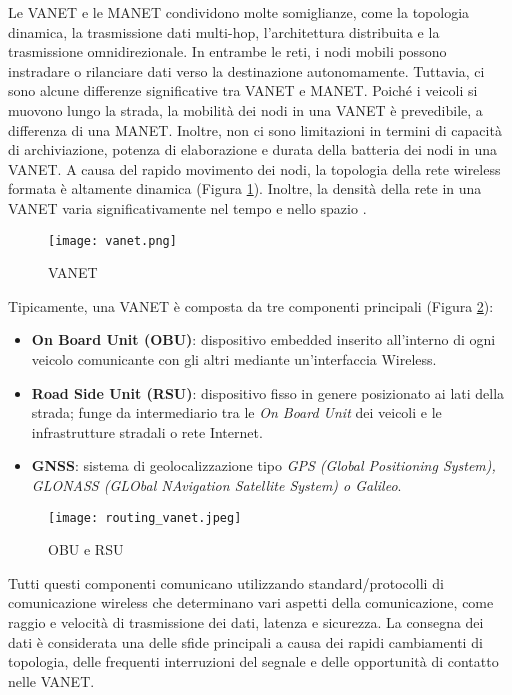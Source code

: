 Le VANET e le MANET condividono molte somiglianze, come la topologia dinamica, la trasmissione dati multi-hop, l'architettura distribuita e la trasmissione omnidirezionale. In entrambe le reti, i nodi mobili possono instradare o rilanciare dati verso la destinazione autonomamente. Tuttavia, ci sono alcune differenze significative tra VANET e MANET. Poiché i veicoli si muovono lungo la strada, la mobilità dei nodi in una VANET è prevedibile, a differenza di una MANET. Inoltre, non ci sono limitazioni in termini di capacità di archiviazione, potenza di elaborazione e durata della batteria dei nodi in una VANET. A causa del rapido movimento dei nodi, la topologia della rete wireless formata è altamente dinamica (Figura \ref{fig:vanet}). Inoltre, la densità della rete in una VANET varia significativamente nel tempo e nello spazio \cite{anwer2014survey} \cite{vehicular-ad-hoc}.

\begin{figure}[h!]
    \centering
    \texttt{[image: vanet.png]}
    \caption{VANET}
    \label{fig:vanet}
\end{figure}

Tipicamente, una VANET è composta da tre componenti principali (Figura \ref{fig:obu_rsu}): 
\begin{itemize}
    \item \textbf{On Board Unit (OBU)}: dispositivo embedded inserito all'interno di ogni veicolo comunicante con gli altri mediante un'interfaccia Wireless.
    \item \textbf{Road Side Unit (RSU)}: dispositivo fisso in genere posizionato ai lati della strada; funge da intermediario tra le \textit{On Board Unit} dei veicoli e le infrastrutture stradali o rete Internet.
    \item \textbf{GNSS}: sistema di geolocalizzazione tipo \textit{GPS (Global Positioning System), GLONASS (GLObal NAvigation Satellite System) o Galileo}.
\end{itemize}

\begin{figure}[h!]
    \centering
    \texttt{[image: routing\_vanet.jpeg]}
    \caption{OBU e RSU}
    \label{fig:obu_rsu}
\end{figure}

Tutti questi componenti comunicano utilizzando standard/protocolli di comunicazione wireless che determinano vari aspetti della comunicazione, come raggio e velocità di trasmissione dei dati, latenza e sicurezza. La consegna dei dati è considerata una delle sfide principali a causa dei rapidi cambiamenti di topologia, delle frequenti interruzioni del segnale e delle opportunità di contatto nelle VANET. 

